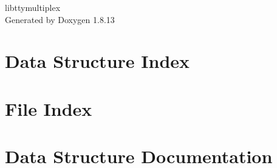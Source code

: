 \documentclass[twoside]{book}
\newcommand{\+}{\discretionary{\mbox{\scriptsize$\hookleftarrow$}}{}{}}
\newcommand{\clearemptydoublepage}{%
  \newpage{\pagestyle{empty}\cleardoublepage}%
}
\begin{document}
\hypersetup{pageanchor=false,
             bookmarksnumbered=true,
             pdfencoding=unicode
            }
\begin{titlepage}
\vspace*{7cm}
\begin{center}%
{\Large libttymultiplex }\\
\vspace*{1cm}
{\large Generated by Doxygen 1.8.13}\\
\end{center}
\end{titlepage}
\clearemptydoublepage
{}
\tableofcontents
\clearemptydoublepage
{}
\hypersetup{pageanchor=true}

\chapter{Data Structure Index}

\chapter{File Index}

\chapter{Data Structure Documentation}
























\end{document}
